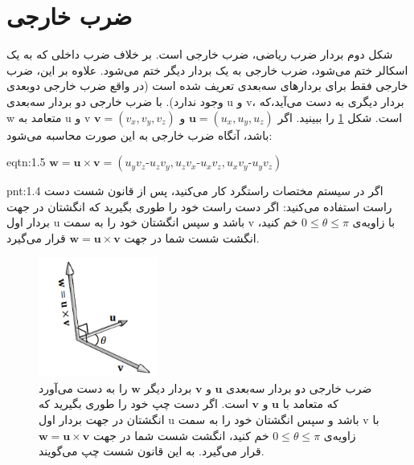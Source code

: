 \section{\textbf{ضرب خارجی}}
\label{sec:1.4}
{
    \Large
    \begin{spacing}{1.5}
        شکل دوم بردار ضرب ریاضی، ضرب خارجی است.
        بر خلاف ضرب داخلی که به یک اسکالر ختم می‌شود، ضرب خارجی به یک بردار دیگر ختم می‌شود.
        علاوه بر این، ضرب خارجی فقط برای بردارهای سه‌بعدی تعریف شده است (در واقع ضرب خارجی دو‌بعدی وجود ندارد).
        با ضرب خارجی دو بردار سه‌بعدی u و v، بردار دیگری به دست می‌آید،که w متعامد به u و v است.
        شکل \ref{fig:4.Session.1.1.13} را ببینید.
        اگر $\textbf{u}=(u_{x},u_{y},u_{z})$ و  $\textbf{v}=(v_{x},v_{y},v_{z})$ باشد، آنگاه ضرب خارجی به این صورت محاسبه می‌شود:

        \begin{eqtn}{eqtn:1.5}
            \centering
            $\textbf{w}=\textbf{u}\times\textbf{v}=(u_{y}v_{z}\textbf{-}u_{z}v_{y}, u_{z}v_{x}\textbf{-}u_{x}v_{z}, u_{x}v_{y}\textbf{-}u_{y}v_{z})$
        \end{eqtn}

        \begin{point}{pnt:1.4}
            \Large
            اگر در سیستم مختصات راستگرد کار می‌کنید، پس از قانون شست دست راست استفاده می‌کنید:
            اگر دست راست خود را طوری بگیرید که انگشتان در جهت بردار اول u باشد و سپس انگشتان خود را به سمت v با زاویه‌ی $0\leq\theta\leq\pi$ خم کنید، انگشت شست شما در جهت $\textbf{w}=\textbf{u}\times\textbf{v}$ قرار می‌گیرد.
        \end{point}

        \begin{figure}[H]
            \centering
            \setlength{\belowcaptionskip}{-10pt}
            \includegraphics[width=0.35\textwidth]{Images/4/1/4.Session.1.1.13}
            \caption{ضرب خارجی دو بردار سه‌بعدی $\textbf{u}$ و $\textbf{v}$ بردار دیگر $\textbf{w}$ را به دست می‌آورد که متعامد با $\textbf{u}$ و $\textbf{v}$ است.
            اگر دست چپ خود را طوری بگیرید که انگشتان در جهت بردار اول u باشد و سپس انگشتان خود را به سمت v با زاویه‌ی $0\leq\theta\leq\pi$ خم کنید، انگشت شست شما در جهت $\textbf{w}=\textbf{u}\times\textbf{v}$ قرار می‌گیرد. به این قانون شست چپ می‌گویند.}
            \label{fig:4.Session.1.1.13}
        \end{figure}


\end{spacing}}

